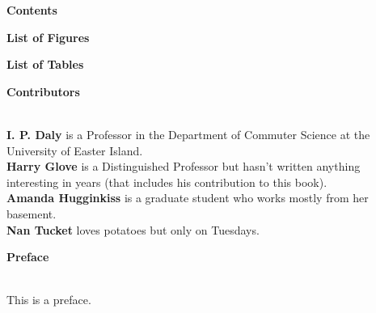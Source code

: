 \begin{center}{\Large \textbf{Contents}}\end{center}
\def\contentsname{\empty}
\pagestyle{plain}
\tableofcontents

\newpage

\setcounter{tocdepth}{2}
\begin{center}{\Large \textbf{List of Figures}}\end{center}
\def\listfigurename{\empty}
\pagestyle{plain}
\listoffigures

\newpage

\setcounter{tocdepth}{2}
\begin{center}{\Large \textbf{List of Tables}}\end{center}
\def\listtablename{\empty}
\pagestyle{plain}
\listoftables

\newpage

\pagestyle{plain}

\begin{center}{\Large \textbf{Contributors}}\end{center}

\mbox{ } \\[48pt]

\noindent \textbf{I. P. Daly} is a Professor in the Department of 
Commuter Science at the University of Easter Island.\\

\noindent \textbf{Harry Glove} is a Distinguished Professor but hasn't written
anything interesting in years (that includes his contribution to this book).\\


\noindent \textbf{Amanda Hugginkiss} is a graduate student who works mostly from
her basement.\\

\noindent \textbf{Nan Tucket} loves potatoes but only on Tuesdays.\\

\newpage

\begin{center}{\Large \textbf{Preface}}\end{center}

\mbox{ } \\[48pt]

\noindent This is a preface.

\newpage
